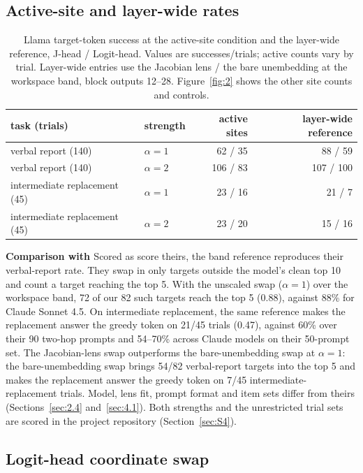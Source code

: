 \documentclass[11pt,a4paper]{article}
\begin{document}
\subsection{Active-site and layer-wide rates}\label{sec:S3.4}

\begin{table}[htbp]
\centering
\caption{Llama target-token success at the active-site condition and the layer-wide reference, J-head / Logit-head. Values are successes/trials; active counts vary by trial. Layer-wide entries use the Jacobian lens / the bare unembedding at the workspace band, block outputs 12--28. Figure~\ref{fig:2} shows the other site counts and controls.}
\label{tab:S3}
\begin{tabular}{@{}llrr@{}}
\toprule
task (trials) & strength & active sites & layer-wide reference \\
\midrule
verbal report (140) & $\alpha=1$ & 62 / 35 & 88 / 59 \\
verbal report (140) & $\alpha=2$ & 106 / 83 & 107 / 100 \\
intermediate replacement (45) & $\alpha=1$ & 23 / 16 & 21 / 7 \\
intermediate replacement (45) & $\alpha=2$ & 23 / 20 & 15 / 16 \\
\bottomrule
\end{tabular}
\end{table}

\textbf{Comparison with \citeauthor{gurnee2026}} Scored as \citeauthor{gurnee2026} score theirs, the band reference reproduces their verbal-report rate. They swap in only targets outside the model's clean top 10 and count a target reaching the top 5. With the unscaled swap ($\alpha=1$) over the workspace band, 72 of our 82 such targets reach the top 5 (0.88), against 88\% for Claude Sonnet 4.5. On intermediate replacement, the same reference makes the replacement answer the greedy token on 21/45 trials (0.47), against 60\% over their 90 two-hop prompts and 54--70\% across Claude models on their 50-prompt set. The Jacobian-lens swap outperforms the bare-unembedding swap at $\alpha=1$: the bare-unembedding swap brings 54/82 verbal-report targets into the top 5 and makes the replacement answer the greedy token on 7/45 intermediate-replacement trials. Model, lens fit, prompt format and item sets differ from theirs (Sections~\ref{sec:2.4} and~\ref{sec:4.1}). Both strengths and the unrestricted trial sets are scored in the project repository (Section~\ref{sec:S4}).

\subsection{Logit-head coordinate swap}\label{sec:S3.5}
\end{document}
